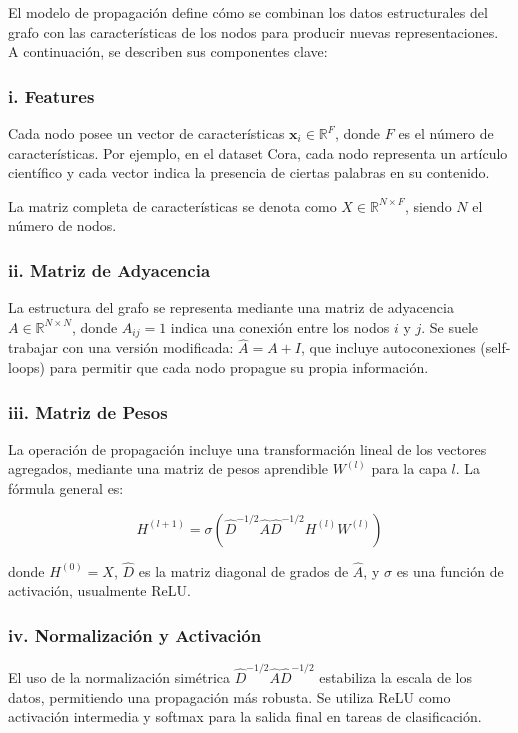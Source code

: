 \documentclass[11pt]{article} %
\begin{document}
El modelo de propagación define cómo se combinan los datos estructurales del grafo con las características de los nodos para producir nuevas representaciones. A continuación, se describen sus componentes clave:

\subsubsection*{i. Features}

Cada nodo posee un vector de características $\mathbf{x}_i \in \mathbb{R}^F$, donde $F$ es el número de características. Por ejemplo, en el dataset Cora, cada nodo representa un artículo científico y cada vector indica la presencia de ciertas palabras en su contenido.

La matriz completa de características se denota como $X \in \mathbb{R}^{N \times F}$, siendo $N$ el número de nodos.

\subsubsection*{ii. Matriz de Adyacencia}

La estructura del grafo se representa mediante una matriz de adyacencia $A \in \mathbb{R}^{N \times N}$, donde $A_{ij} = 1$ indica una conexión entre los nodos $i$ y $j$. Se suele trabajar con una versión modificada: $\hat{A} = A + I$, que incluye autoconexiones (self-loops) para permitir que cada nodo propague su propia información.

\subsubsection*{iii. Matriz de Pesos}

La operación de propagación incluye una transformación lineal de los vectores agregados, mediante una matriz de pesos aprendible $W^{(l)}$ para la capa $l$. La fórmula general es:

\[
H^{(l+1)} = \sigma\left( \hat{D}^{-1/2} \hat{A} \hat{D}^{-1/2} H^{(l)} W^{(l)} \right)
\]

donde $H^{(0)} = X$, $\hat{D}$ es la matriz diagonal de grados de $\hat{A}$, y $\sigma$ es una función de activación, usualmente ReLU.

\subsubsection*{iv. Normalización y Activación}

El uso de la normalización simétrica $\hat{D}^{-1/2} \hat{A} \hat{D}^{-1/2}$ estabiliza la escala de los datos, permitiendo una propagación más robusta. Se utiliza ReLU como activación intermedia y softmax para la salida final en tareas de clasificación.
\end{document}

